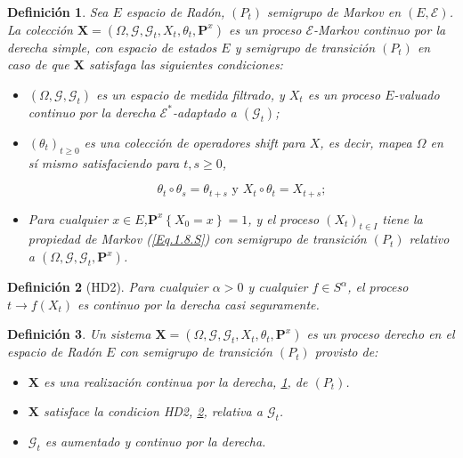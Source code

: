 \documentclass{article}
\newtheorem{Def}{Definición}
\newcommand{\ER}{\left(E,\mathcal{E}\right)}
\newcommand{\PE}{\left(X_{t}\right)_{t\in I}}
\newcommand{\SG}{\left(P_{t}\right)}
\newcommand{\CM}{\mathbf{P}^{x}}
\begin{document}
\begin{Def}\label{Def.2.2.S}
Sea $E$ espacio de Rad\'on, $\SG$ semigrupo de Markov en $\ER$. La colecci\'on $\mathbf{X}=\left(\Omega,\mathcal{G},\mathcal{G}_{t},X_{t},\theta_{t},\CM\right)$ es un proceso $\mathcal{E}$-Markov continuo por la derecha simple, con espacio de estados $E$ y semigrupo de transici\'on $\SG$ en caso de que $\mathbf{X}$ satisfaga las siguientes condiciones:
\begin{itemize}
\item[i)] $\left(\Omega,\mathcal{G},\mathcal{G}_{t}\right)$ es un espacio de medida filtrado, y $X_{t}$ es un proceso $E$-valuado continuo por la derecha $\mathcal{E}^{*}$-adaptado a $\left(\mathcal{G}_{t}\right)$;

\item[ii)] $\left(\theta_{t}\right)_{t\geq0}$ es una colecci\'on de operadores {\em shift} para $X$, es decir, mapea $\Omega$ en s\'i mismo satisfaciendo para $t,s\geq0$,

\begin{equation}\label{Eq.Shift}
\theta_{t}\circ\theta_{s}=\theta_{t+s}\textrm{ y }X_{t}\circ\theta_{t}=X_{t+s};
\end{equation}

\item[iii)] Para cualquier $x\in E$,$\CM\left\{X_{0}=x\right\}=1$, y el proceso $\PE$ tiene la propiedad de Markov (\ref{Eq.1.8.S}) con semigrupo de transici\'on $\SG$ relativo a $\left(\Omega,\mathcal{G},\mathcal{G}_{t},\CM\right)$.
\end{itemize}
\end{Def}

\begin{Def}[HD2]\label{Eq.2.2.S}
Para cualquier $\alpha>0$ y cualquier $f\in S^{\alpha}$, el proceso $t\rightarrow f\left(X_{t}\right)$ es continuo por la derecha casi seguramente.
\end{Def}

\begin{Def}\label{Def.PD}
Un sistema $\mathbf{X}=\left(\Omega,\mathcal{G},\mathcal{G}_{t},X_{t},\theta_{t},\CM\right)$ es un proceso derecho en el espacio de Rad\'on $E$ con semigrupo de transici\'on $\SG$ provisto de:
\begin{itemize}
\item[i)] $\mathbf{X}$ es una realizaci\'on  continua por la derecha, \ref{Def.2.2.S}, de $\SG$.

\item[ii)] $\mathbf{X}$ satisface la condicion HD2, \ref{Eq.2.2.S}, relativa a $\mathcal{G}_{t}$.

\item[iii)] $\mathcal{G}_{t}$ es aumentado y continuo por la derecha.
\end{itemize}
\end{Def}
\end{document}
